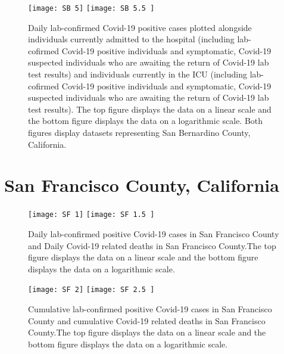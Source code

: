 \documentclass{article}
\begin{document}
\FloatBarrier

\begin{figure}[!htbp]
	\begin{center}
		\texttt{[image: SB 5]}
		\vspace{1mm}
		\texttt{[image: SB 5.5 ]}
		\caption{ Daily lab-confirmed Covid-19 positive cases plotted alongside individuals currently admitted to the hospital (including lab-cofirmed Covid-19 positive individuals and symptomatic, Covid-19 suspected individuals who are awaiting the return of Covid-19 lab test results) and individuals currently in the ICU (including lab-cofirmed Covid-19 positive individuals and symptomatic, Covid-19 suspected individuals who are awaiting the return of Covid-19 lab test results). The top figure displays the data on a linear scale and the bottom figure displays the data on a logarithmic scale. Both figures display datasets representing San Bernardino County, California.}
		\label{fig:14}
	\end{center}
\end{figure}

\FloatBarrier




\section{San Francisco County, California}


\begin{figure}[!htbp]
	\begin{center}
		\texttt{[image: SF 1]}
		\vspace{1mm}
		\texttt{[image: SF 1.5 ]}
		\caption{ Daily lab-confirmed positive Covid-19 cases in San Francisco County and Daily Covid-19 related deaths in San Francisco County.The top figure displays the data on a linear scale and the bottom figure displays the data on a logarithmic scale. }
		\label{fig:15}
	\end{center}
\end{figure}

\FloatBarrier

\begin{figure}[!htbp]
	\begin{center}
		\texttt{[image: SF 2]}
		\vspace{1mm}
		\texttt{[image: SF 2.5 ]}
		\caption{Cumulative lab-confirmed positive Covid-19 cases in San Francisco County and cumulative Covid-19 related deaths in San Francisco County.The top figure displays the data on a linear scale and the bottom figure displays the data on a logarithmic scale. }
		\label{fig:16}
	\end{center}
\end{figure}
\end{document}
